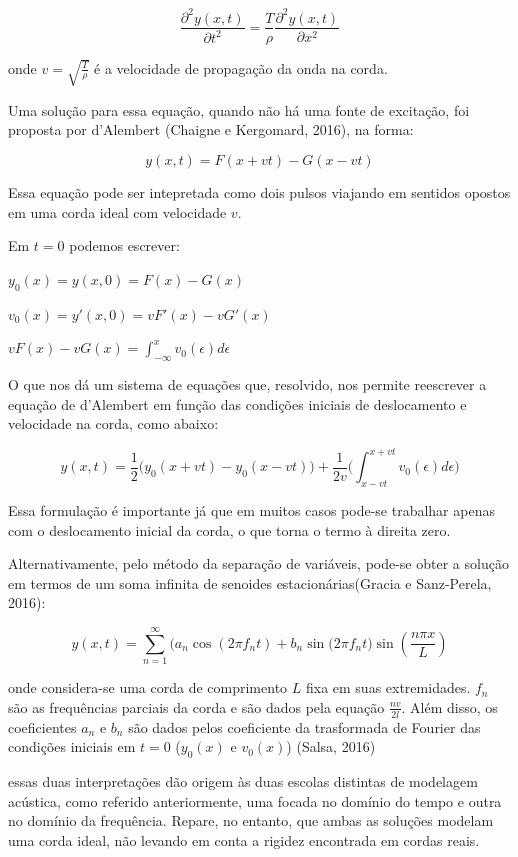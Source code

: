\documentclass[]{article}
\begin{document}
\[\frac{\partial^2 y(x,t)}{\partial t^2} =\frac{T}{\rho} \frac{\partial^2 y(x,t)}{\partial x^2}\]

onde \(v = \sqrt{\frac{T}{\rho}}\) é a velocidade de propagação da onda
na corda.

Uma solução para essa equação, quando não há uma fonte de excitação, foi
proposta por d'Alembert (Chaigne e Kergomard, 2016), na forma:

\[y(x,t)=F(x+vt)-G(x-vt)\]

Essa equação pode ser intepretada como dois pulsos viajando em sentidos
opostos em uma corda ideal com velocidade \(v\).

Em \(t=0\) podemos escrever:

\(y_0(x)=y(x,0)=F(x)-G(x)\)

\(v_0(x)=y'(x,0)=vF'(x)-vG'(x)\)

\(vF(x)-vG(x)= \int_{-\infty}^x v_0(\epsilon) d\epsilon\)

O que nos dá um sistema de equações que, resolvido, nos permite
reescrever a equação de d'Alembert em função das condições iniciais de
deslocamento e velocidade na corda, como abaixo:

\[y(x,t)= \frac{1}{2} \Big(y_0(x+vt)-y_0(x-vt) \Big) + \frac{1}{2v}\Big(\int_{x-vt}^{x+vt} v_0(\epsilon) d\epsilon \Big)\]

Essa formulação é importante já que em muitos casos pode-se trabalhar
apenas com o deslocamento inicial da corda, o que torna o termo à
direita zero.

Alternativamente, pelo método da separação de variáveis, pode-se obter a
solução em termos de um soma infinita de senoides estacionárias(Gracia e
Sanz-Perela, 2016):

\[y(x,t)= \sum_{n=1}^{\infty} \big(a_n \cos(2 \pi f_n t) +  b_n \sin(2 \pi f_n t\big) \sin(\frac{n \pi x}{L})\]

onde considera-se uma corda de comprimento \(L\) fixa em suas
extremidades. \(f_n\) são as frequências parciais da corda e são dados
pela equação \(\frac{nv}{2l}\). Além disso, os coeficientes \(a_n\) e
\(b_n\) são dados pelos coeficiente da trasformada de Fourier das
condições iniciais em \(t=0\) (\(y_0(x)\) e \(v_0(x)\)) (Salsa, 2016)

essas duas interpretações dão origem às duas escolas distintas de
modelagem acústica, como referido anteriormente, uma focada no domínio
do tempo e outra no domínio da frequência. Repare, no entanto, que ambas
as soluções modelam uma corda ideal, não levando em conta a rigidez
encontrada em cordas reais.
\end{document}

